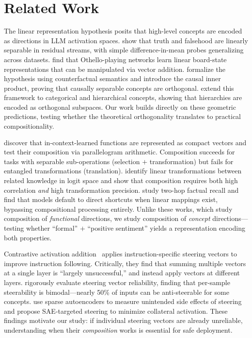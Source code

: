 \section{Related Work}
\label{sec:related}

The linear representation hypothesis posits that high-level concepts are
encoded as directions in LLM activation spaces. \citet{marks2023geometry}
show that truth and falsehood are linearly separable in residual
streams, with simple difference-in-mean probes generalizing across
datasets. \citet{nanda2023emergent} find that Othello-playing networks
learn linear board-state representations that can be manipulated via
vector addition. \citet{park2023linear} formalize the hypothesis using
counterfactual semantics and introduce the causal inner product, proving
that causally separable concepts are orthogonal. \citet{park2024geometry}
extend this framework to categorical and hierarchical concepts, showing
that hierarchies are encoded as orthogonal subspaces. Our work builds
directly on these geometric predictions, testing whether the theoretical
orthogonality translates to practical compositionality.

\citet{todd2023function} discover that in-context-learned functions are
represented as compact vectors and test their composition via
parallelogram arithmetic. Composition succeeds for tasks with separable
sub-operations (\eg selection $+$ transformation) but fails for
entangled transformations (\eg translation). \citet{peng2025linear}
identify linear transformations between related knowledge in logit space
and show that composition requires both high correlation \emph{and} high
transformation precision. \citet{khandelwal2025compose} study two-hop
factual recall and find that models default to direct shortcuts when
linear mappings exist, bypassing compositional processing entirely.
Unlike these works, which study composition of \emph{functional}
directions, we study composition of \emph{concept} directions---testing
whether ``formal'' $+$ ``positive sentiment'' yields a representation
encoding both properties.

Contrastive activation addition~\citep{stolfo2024improving} applies
instruction-specific steering vectors to improve instruction following.
Critically, they find that summing multiple vectors at a single layer is
``largely unsuccessful,'' and instead apply vectors at different layers.
\citet{tan2024analyzing} rigorously evaluate steering vector reliability,
finding that per-sample steerability is bimodal---nearly 50\% of inputs
can be anti-steerable for some concepts. \citet{chalnev2024improving}
use sparse autoencoders to measure unintended side effects of steering
and propose SAE-targeted steering to minimize collateral activation.
These findings motivate our study: if individual steering vectors are
already unreliable, understanding when their \emph{composition} works is
essential for safe deployment.

